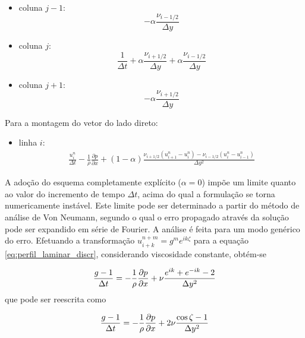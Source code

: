 \begin{itemize}
	\item{coluna $j-1$:}
		\begin{equation}
			-\alpha \frac{\nu_{i-1/2}}{\Delta y}
		\end{equation}
	\item{coluna $j$:}
		\begin{equation}
			\frac{1}{\Delta t} 
			+ \alpha \frac{\nu_{i+1/2}}{\Delta y}
			+ \alpha \frac{\nu_{i-1/2}}{\Delta y}
		\end{equation}
	\item{coluna $j+1$:}
		\begin{equation}
			-\alpha \frac{\nu_{i+1/2}}{\Delta y}
		\end{equation}
\end{itemize}

Para a montagem do vetor do lado direto:

\begin{itemize}
	\item{linha $i$:}
		\begin{eqnarray}
			\frac{u_i^{n}}{\Delta t} 
			-\frac{1}{\rho}\frac{\partial p}{\partial x} 
			+(1-\alpha)\frac{\nu_{i+1/2}(u_{i+1}^n-u_{i}^n)
			-\nu_{i-1/2}(u_{i}^n-u_{i-1}^n)}{\Delta y^2}
			\label{eq:perfil_turbulento_discr}
		\end{eqnarray}
\end{itemize}

A adoção do esquema completamente explícito ($\alpha=0$) impõe um limite quanto ao valor do incremento de tempo $\Delta t$, acima do qual a formulação se torna numericamente instável. Este limite pode ser determinado a partir do método de análise de Von Neumann, segundo o qual o erro propagado através da solução pode ser expandido em série de Fourier. A análise é feita para um modo genérico do erro. Efetuando a transformação $u_{i+k}^{n+m}=g^me^{ik\zeta}$ para a equação \ref{eq:perfil_laminar_discr}, considerando viscosidade constante, obtém-se

\begin{equation}
	\frac{g-1}{\Delta t}=-\frac{1}{\rho}\frac{\partial p}{\partial x}+\nu\frac{e^{ik}+e^{-ik}-2}{\Delta y^2}
\end{equation}
que pode ser reescrita como

\begin{equation}
	\frac{g-1}{\Delta t}=-\frac{1}{\rho}\frac{\partial p}{\partial x}+2\nu\frac{\cos\zeta-1}{\Delta y^2}
\end{equation}

